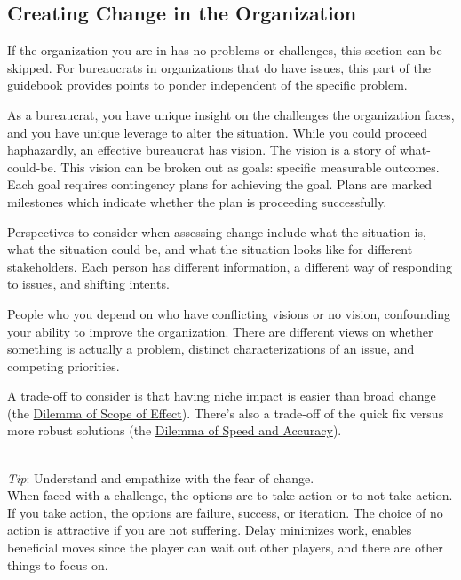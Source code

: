 \subsection*{Creating Change in the Organization\label{sec:creating-change}}

If the organization you are in has no problems or challenges, this section can be skipped. For bureaucrats in organizations that do have issues, this part of the guidebook provides points to ponder independent of the specific problem.

As a bureaucrat, you have unique insight on the challenges the organization faces, and you have unique leverage to alter the situation.  While you could proceed haphazardly, an effective bureaucrat has vision. The vision is a story of what-could-be. This vision can be broken out as goals: specific measurable outcomes. Each goal requires contingency plans for achieving the goal. Plans are marked milestones which indicate whether the plan is proceeding successfully. 

Perspectives to consider when assessing change include what the situation is, what the situation could be, and what the situation looks like for different stakeholders. Each person has different information, a different way of responding to issues, and shifting intents.

People who you depend on who have conflicting visions or no vision, confounding your ability to improve the organization. There are different views on whether something is actually a problem, distinct characterizations of an issue, and competing priorities.

A trade-off to consider is that having niche impact is easier than broad change (the \hyperref[table:scope-broad-vs-narrow]{Dilemma of Scope of Effect}). There's also a trade-off of the quick fix versus more robust solutions (the \hyperref[table:quick-methodical]{Dilemma of Speed and Accuracy}).




\ \\
\textit{Tip}: Understand and empathize with the fear of change. \\
When faced with a challenge, the options are to take action or to not take action. If you take action, the options are failure, success, or iteration. 
The choice of no action is attractive if you are not suffering. Delay minimizes work, enables beneficial moves since the player can wait out other players, and there are other things to focus on.

